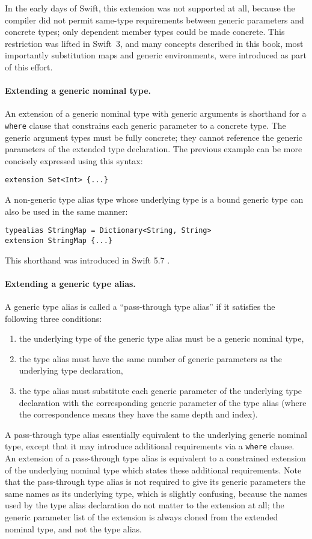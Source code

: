 \documentclass[../generics]{subfiles}
\begin{document}
In the early days of Swift, this extension was not supported at all, because the compiler did not permit same-type requirements between generic parameters and concrete types; only dependent member types could be made concrete. This restriction was lifted in Swift~3, and many concepts described in this book, most importantly substitution maps and generic environments, were introduced as part of this effort.

\paragraph{Extending a generic nominal type.} An extension of a generic nominal type with generic arguments is shorthand for a \texttt{where} clause that constrains each generic parameter to a concrete type. The generic argument types must be fully concrete; they cannot reference the generic parameters of the extended type declaration. The previous example can be more concisely expressed using this syntax:
\begin{Verbatim}
extension Set<Int> {...}
\end{Verbatim}
A non-generic type alias type whose underlying type is a bound generic type can also be used in the same manner:
\begin{Verbatim}
typealias StringMap = Dictionary<String, String>
extension StringMap {...}
\end{Verbatim}
This shorthand was introduced in Swift 5.7 \cite{se0361}.

\paragraph{Extending a generic type alias.}
A generic type alias is called a ``pass-through type alias'' if it satisfies the following three conditions:
\begin{enumerate}
\item the underlying type of the generic type alias must be a generic nominal type,
\item the type alias must have the same number of generic parameters as the underlying type declaration,
\item the type alias must substitute each generic parameter of the underlying type declaration with the corresponding generic parameter of the type alias (where the correspondence means they have the same depth and index).
\end{enumerate}
A pass-through type alias essentially equivalent to the underlying generic nominal type, except that it may introduce additional requirements via a \texttt{where} clause. An extension of a pass-through type alias is equivalent to a constrained extension of the underlying nominal type which states these additional requirements. Note that the pass-through type alias is not required to give its generic parameters the same names as its underlying type, which is slightly confusing, because the names used by the type alias declaration do not matter to the extension at all; the generic parameter list of the extension is always cloned from the extended nominal type, and not the type alias.
\end{document}
